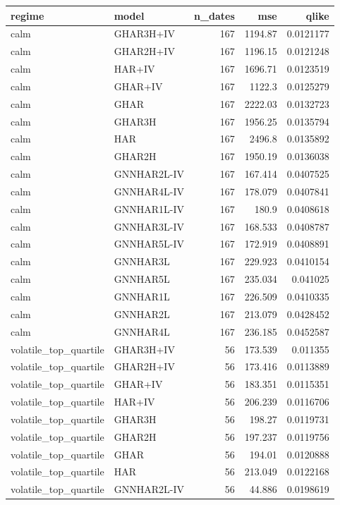 \begin{tabular}{llrrr}
\toprule
regime & model & n_dates & mse & qlike \\
\midrule
calm & GHAR3H+IV & 167 & 1194.87 & 0.0121177 \\
calm & GHAR2H+IV & 167 & 1196.15 & 0.0121248 \\
calm & HAR+IV & 167 & 1696.71 & 0.0123519 \\
calm & GHAR+IV & 167 & 1122.3 & 0.0125279 \\
calm & GHAR & 167 & 2222.03 & 0.0132723 \\
calm & GHAR3H & 167 & 1956.25 & 0.0135794 \\
calm & HAR & 167 & 2496.8 & 0.0135892 \\
calm & GHAR2H & 167 & 1950.19 & 0.0136038 \\
calm & GNNHAR2L-IV & 167 & 167.414 & 0.0407525 \\
calm & GNNHAR4L-IV & 167 & 178.079 & 0.0407841 \\
calm & GNNHAR1L-IV & 167 & 180.9 & 0.0408618 \\
calm & GNNHAR3L-IV & 167 & 168.533 & 0.0408787 \\
calm & GNNHAR5L-IV & 167 & 172.919 & 0.0408891 \\
calm & GNNHAR3L & 167 & 229.923 & 0.0410154 \\
calm & GNNHAR5L & 167 & 235.034 & 0.041025 \\
calm & GNNHAR1L & 167 & 226.509 & 0.0410335 \\
calm & GNNHAR2L & 167 & 213.079 & 0.0428452 \\
calm & GNNHAR4L & 167 & 236.185 & 0.0452587 \\
volatile_top_quartile & GHAR3H+IV & 56 & 173.539 & 0.011355 \\
volatile_top_quartile & GHAR2H+IV & 56 & 173.416 & 0.0113889 \\
volatile_top_quartile & GHAR+IV & 56 & 183.351 & 0.0115351 \\
volatile_top_quartile & HAR+IV & 56 & 206.239 & 0.0116706 \\
volatile_top_quartile & GHAR3H & 56 & 198.27 & 0.0119731 \\
volatile_top_quartile & GHAR2H & 56 & 197.237 & 0.0119756 \\
volatile_top_quartile & GHAR & 56 & 194.01 & 0.0120888 \\
volatile_top_quartile & HAR & 56 & 213.049 & 0.0122168 \\
volatile_top_quartile & GNNHAR2L-IV & 56 & 44.886 & 0.0198619 \\

\end{tabular}
